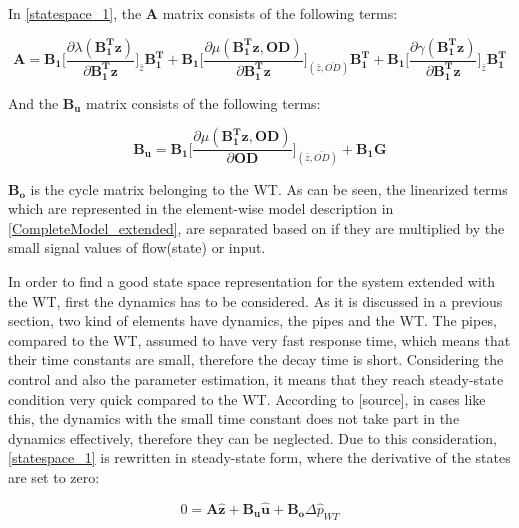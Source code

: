 In \eqref{statespace_1}, the $\pmb{A}$ matrix consists of the following terms: 

\begin{equation}
  \pmb{A} = \pmb{B_1} \bigg[ \frac{\partial{\lambda(\pmb{{B_1^{T}}}\pmb{z})}}{{\partial{\pmb{{B_1^{T}}}\pmb{z}}}}   \bigg]_{\bar{z}} \pmb{{B_1^{T}}} +  \pmb{B_1} \bigg[ \frac{\partial{\mu(\pmb{{B_1^{T}}}\pmb{z}, \pmb{OD})}}{{\partial{\pmb{{B_1^{T}}}\pmb{z}}}}  \bigg]_{(\bar{z}, \bar{OD})} \pmb{{B_1^{T}}} +  \pmb{B_1} \bigg[ \frac{\partial{\gamma(\pmb{{B_1^{T}}}\pmb{z})}}{{\partial{\pmb{{B_1^{T}}}\pmb{z}}}}   \bigg]_{\bar{z}} \pmb{{B_1^{T}}}
\label{Amatrix}
\end{equation}

And the $\pmb{B_u}$ matrix consists of the following terms:

\begin{equation}
  \pmb{B_u} = \pmb{B_1} \bigg[ \frac{\partial{\mu(\pmb{{B_1^{T}}}\pmb{z}, \pmb{OD})}}{{\partial{\pmb{OD}}}}  \bigg]_{(\bar{z}, \bar{OD})} + \pmb{B_1}\pmb{G}  
\label{Bumatrix}
\end{equation}

$\pmb{B_o}$ is the cycle matrix belonging to the WT. As can be seen, the linearized terms which are represented in the element-wise model description in \eqref{CompleteModel_extended}, are separated based on if they are multiplied by the small signal values of flow(state) or input. 

In order to find a good state space representation for the system extended with the WT, first the dynamics has to be considered. As it is discussed in a previous section, two kind of elements have dynamics, the pipes and the WT. The pipes, compared to the WT, assumed to have very fast response time, which means that their time constants are small, therefore the decay time is short. Considering the control and also the parameter estimation, it means that they reach steady-state condition very quick compared to the WT. According to [source], in cases like this, the dynamics with the small time constant does not take part in the dynamics effectively, therefore they can be neglected. Due to this consideration, \eqref{statespace_1} is rewritten in steady-state form, where the derivative of the states are set to zero:

\begin{equation}
 0 = \pmb{A} \pmb{\hat{z}} + \pmb{B_u} \pmb{\hat{u}} + \pmb{B_o} \Delta \hat{p}_{WT}    
 \label{statespace_2}
\end{equation}

